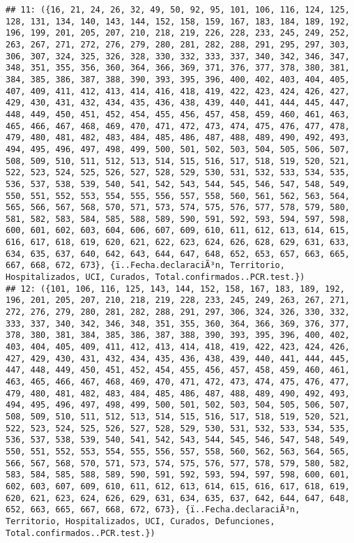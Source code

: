 \documentclass[
]{book}
\begin{document}
\begin{verbatim}
## 11: ({16, 21, 24, 26, 32, 49, 50, 92, 95, 101, 106, 116, 124, 125, 128, 131, 134, 140, 143, 144, 152, 158, 159, 167, 183, 184, 189, 192, 196, 199, 201, 205, 207, 210, 218, 219, 226, 228, 233, 245, 249, 252, 263, 267, 271, 272, 276, 279, 280, 281, 282, 288, 291, 295, 297, 303, 306, 307, 324, 325, 326, 328, 330, 332, 333, 337, 340, 342, 346, 347, 348, 351, 355, 356, 360, 364, 366, 369, 371, 376, 377, 378, 380, 381, 384, 385, 386, 387, 388, 390, 393, 395, 396, 400, 402, 403, 404, 405, 407, 409, 411, 412, 413, 414, 416, 418, 419, 422, 423, 424, 426, 427, 429, 430, 431, 432, 434, 435, 436, 438, 439, 440, 441, 444, 445, 447, 448, 449, 450, 451, 452, 454, 455, 456, 457, 458, 459, 460, 461, 463, 465, 466, 467, 468, 469, 470, 471, 472, 473, 474, 475, 476, 477, 478, 479, 480, 481, 482, 483, 484, 485, 486, 487, 488, 489, 490, 492, 493, 494, 495, 496, 497, 498, 499, 500, 501, 502, 503, 504, 505, 506, 507, 508, 509, 510, 511, 512, 513, 514, 515, 516, 517, 518, 519, 520, 521, 522, 523, 524, 525, 526, 527, 528, 529, 530, 531, 532, 533, 534, 535, 536, 537, 538, 539, 540, 541, 542, 543, 544, 545, 546, 547, 548, 549, 550, 551, 552, 553, 554, 555, 556, 557, 558, 560, 561, 562, 563, 564, 565, 566, 567, 568, 570, 571, 573, 574, 575, 576, 577, 578, 579, 580, 581, 582, 583, 584, 585, 588, 589, 590, 591, 592, 593, 594, 597, 598, 600, 601, 602, 603, 604, 606, 607, 609, 610, 611, 612, 613, 614, 615, 616, 617, 618, 619, 620, 621, 622, 623, 624, 626, 628, 629, 631, 633, 634, 635, 637, 640, 642, 643, 644, 647, 648, 652, 653, 657, 663, 665, 667, 668, 672, 673}, {ï..Fecha.declaraciÃ³n, Territorio, Hospitalizados, UCI, Curados, Total.confirmados..PCR.test.})
## 12: ({101, 106, 116, 125, 143, 144, 152, 158, 167, 183, 189, 192, 196, 201, 205, 207, 210, 218, 219, 228, 233, 245, 249, 263, 267, 271, 272, 276, 279, 280, 281, 282, 288, 291, 297, 306, 324, 326, 330, 332, 333, 337, 340, 342, 346, 348, 351, 355, 360, 364, 366, 369, 376, 377, 378, 380, 381, 384, 385, 386, 387, 388, 390, 393, 395, 396, 400, 402, 403, 404, 405, 409, 411, 412, 413, 414, 418, 419, 422, 423, 424, 426, 427, 429, 430, 431, 432, 434, 435, 436, 438, 439, 440, 441, 444, 445, 447, 448, 449, 450, 451, 452, 454, 455, 456, 457, 458, 459, 460, 461, 463, 465, 466, 467, 468, 469, 470, 471, 472, 473, 474, 475, 476, 477, 479, 480, 481, 482, 483, 484, 485, 486, 487, 488, 489, 490, 492, 493, 494, 495, 496, 497, 498, 499, 500, 501, 502, 503, 504, 505, 506, 507, 508, 509, 510, 511, 512, 513, 514, 515, 516, 517, 518, 519, 520, 521, 522, 523, 524, 525, 526, 527, 528, 529, 530, 531, 532, 533, 534, 535, 536, 537, 538, 539, 540, 541, 542, 543, 544, 545, 546, 547, 548, 549, 550, 551, 552, 553, 554, 555, 556, 557, 558, 560, 562, 563, 564, 565, 566, 567, 568, 570, 571, 573, 574, 575, 576, 577, 578, 579, 580, 582, 583, 584, 585, 588, 589, 590, 591, 592, 593, 594, 597, 598, 600, 601, 602, 603, 607, 609, 610, 611, 612, 613, 614, 615, 616, 617, 618, 619, 620, 621, 623, 624, 626, 629, 631, 634, 635, 637, 642, 644, 647, 648, 652, 663, 665, 667, 668, 672, 673}, {ï..Fecha.declaraciÃ³n, Territorio, Hospitalizados, UCI, Curados, Defunciones, Total.confirmados..PCR.test.})

\end{verbatim}
\end{document}
